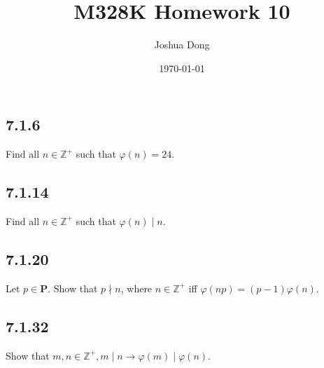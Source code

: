 \documentclass{article}
\begin{document}
\title{M328K\: Homework 10}
\author{Joshua Dong}
\date{\today}
\maketitle

\subsection{7.1.6}
Find all $n \in \mathbb{Z}^+$ such that $\varphi(n)=24$.

\subsection{7.1.14}
Find all $n \in \mathbb{Z}^+$ such that $\varphi(n) \mid n$.

\subsection{7.1.20}
Let $p \in \textbf{P}$.
Show that $p \nmid n$,
where $n \in \mathbb{Z}^+$
iff $\varphi(np) = (p-1)\varphi(n)$.

\subsection{7.1.32}
Show that $m, n \in \mathbb{Z}^+, m \mid n \rightarrow
\varphi(m) \mid \varphi(n)$.
\end{document}
